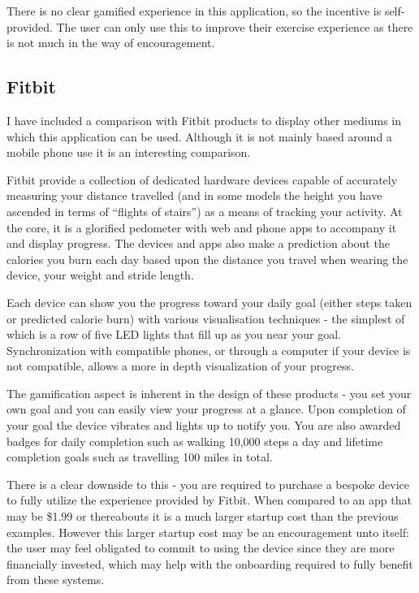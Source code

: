 There is no clear gamified experience in this application, so the
incentive is self-provided. The user can only use this to improve
their exercise experience as there is not much in the way of
encouragement. 

\subsection{Fitbit}
\label{sec:fitbit}
I have included a comparison with Fitbit products to display other
mediums in which this application can be used. Although it is not
mainly based around a mobile phone use it is an interesting comparison.

Fitbit provide a collection of dedicated hardware devices capable of
accurately measuring your distance travelled (and in some models the
height you have ascended in terms of ``flights of stairs'') as a means
of tracking your activity. At the core, it is a glorified pedometer
with web and phone apps to accompany it and display progress. The
devices and apps also make a prediction about the calories you burn each
day based upon the distance you travel when wearing the device, your
weight and stride length. 

Each device can show you the progress toward your daily goal (either
steps taken or predicted calorie burn) with various visualisation
techniques - the simplest of which is a row of five LED lights that
fill up as you near your goal. Synchronization with compatible phones,
or through a computer if your device is not compatible, allows a more
in depth visualization of your progress.

The gamification aspect is inherent in the design of these products -
you set your own goal and you can easily view your progress at a
glance. Upon completion of your goal the device vibrates and lights up
to notify you. You are also awarded badges for daily completion such
as walking 10,000 steps a day and lifetime completion goals such as
travelling 100 miles in total.

There is a clear downside to this - you are required to purchase a
bespoke device to fully utilize the experience provided by
Fitbit. When compared to an app that may be \$1.99 or thereabouts it is
a much larger startup cost than the previous examples. However this
larger startup cost may be an encouragement unto itself: the user may
feel obligated to commit to using the device since they are more
financially invested, which may help with the onboarding required to
fully benefit from these systems.

